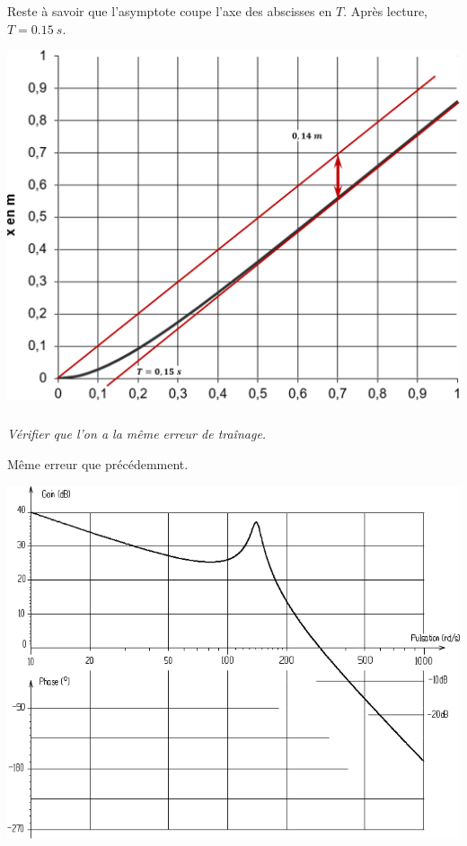 \documentclass[10pt,fleqn]{article} %
\begin{document}
\begin{multicols}{2}
\begin{corrige}
Reste à savoir que l'asymptote coupe l'axe des abscisses en $T$. Après lecture, $T=\SI{0,15}{s}$.
\end{corrige} 
\begin{center}
\includegraphics[width=\linewidth]{images/cor_04}
\end{center}
\else \fi





\subparagraph{}\textit{Vérifier que l'on a la même erreur de traînage.}
\ifprof \begin{corrige}
Même erreur que précédemment.
\end{corrige} \else \fi
\end{multicols}

\ifprof
\else
\begin{center}
\includegraphics[width=\linewidth]{images/fig_02}
\end{center}
\fi
\end{document}
